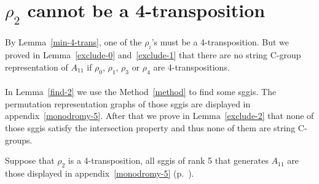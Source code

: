 \section{$\rho_2$ cannot be a 4-transposition}

\paragraph{}
By Lemma~\ref{min-4-trans}, one of the $\rho_i$'s must be a 4-transposition. But we proved in Lemma~\ref{exclude-0} and~\ref{exclude-1} that there are no string C-group representation of $A_{11}$ if $\rho_0$, $\rho_1$, $\rho_3$ or $\rho_4$ are 4-transpositions.

\paragraph{}
In Lemma~\ref{find-2} we use the Method~\ref{method} to find some sggis. The permutation representation graphs of those sggis are displayed in appendix~\ref{monodromy-5}. After that we prove in Lemma~\ref{exclude-2} that none of those sggis satisfy the intersection property and thus none of them are string C-groups.

\begin{lemma}
  \label{find-2}
  Suppose that $\rho_2$ is a 4-transposition, all sggis of rank 5 that generates $A_{11}$ are those displayed in appendix~\ref{monodromy-5} (p.~\pageref{monodromy-5}).
\end{lemma}

